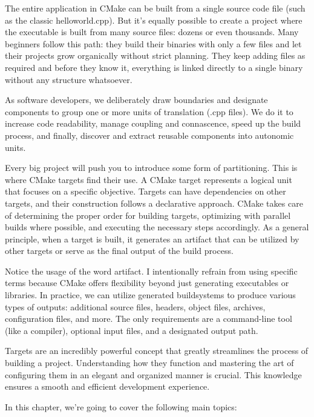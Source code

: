 The entire application in CMake can be built from a single source code file (such as the classic helloworld.cpp). But it’s equally possible to create a project where the executable is built from many source files: dozens or even thousands. Many beginners follow this path: they build their binaries with only a few files and let their projects grow organically without strict planning. They keep adding files as required and before they know it, everything is linked directly to a single binary without any structure whatsoever.

As software developers, we deliberately draw boundaries and designate components to group one or more units of translation (.cpp files). We do it to increase code readability, manage coupling and connascence, speed up the build process, and finally, discover and extract reusable components into autonomic units.

Every big project will push you to introduce some form of partitioning. This is where CMake targets find their use. A CMake target represents a logical unit that focuses on a specific objective. Targets can have dependencies on other targets, and their construction follows a declarative approach. CMake takes care of determining the proper order for building targets, optimizing with parallel builds where possible, and executing the necessary steps accordingly. As a general principle, when a target is built, it generates an artifact that can be utilized by other targets or serve as the final output of the build process.

Notice the usage of the word artifact. I intentionally refrain from using specific terms because CMake offers flexibility beyond just generating executables or libraries. In practice, we can utilize generated buildsystems to produce various types of outputs: additional source files, headers, object files, archives, configuration files, and more. The only requirements are a command-line tool (like a compiler), optional input files, and a designated output path.

Targets are an incredibly powerful concept that greatly streamlines the process of building a project. Understanding how they function and mastering the art of configuring them in an elegant and organized manner is crucial. This knowledge ensures a smooth and efficient development experience.

In this chapter, we’re going to cover the following main topics:

